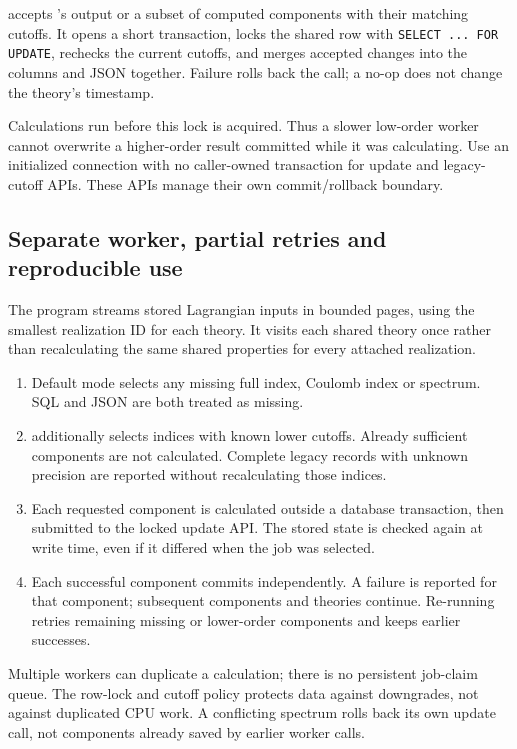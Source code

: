  accepts
's output or a subset of computed components
with their matching cutoffs. It opens a short transaction, locks the shared
row with \texttt{SELECT ... FOR UPDATE}, rechecks the current cutoffs, and merges
accepted changes into the columns and JSON together. Failure rolls back the
call; a no-op does not change the theory's  timestamp.

Calculations run before this lock is acquired. Thus a slower low-order worker
cannot overwrite a higher-order result committed while it was calculating.
Use an initialized connection with no caller-owned transaction for update and
legacy-cutoff APIs. These APIs manage their own commit/rollback boundary.

\clearpage
\subsection{Separate worker, partial retries and reproducible use}
The program  streams stored Lagrangian
inputs in bounded pages, using the smallest realization ID for each theory.
It visits each shared theory once rather than recalculating the same shared
properties for every attached realization.
\begin{enumerate}
\item Default mode selects any missing full index, Coulomb index or spectrum.
SQL  and JSON  are both treated as missing.
\item {} additionally selects indices with known lower cutoffs.
Already sufficient components are not calculated. Complete legacy records with
unknown precision are reported without recalculating those indices.
\item Each requested component is calculated outside a database transaction,
then submitted to the locked update API. The stored state is checked again at
write time, even if it differed when the job was selected.
\item Each successful component commits independently. A failure is reported
for that component; subsequent components and theories continue. Re-running
retries remaining missing or lower-order components and keeps earlier successes.
\end{enumerate}
Multiple workers can duplicate a calculation; there is no persistent job-claim
queue. The row-lock and cutoff policy protects data against downgrades, not
against duplicated CPU work. A conflicting spectrum rolls back its own update
call, not components already saved by earlier worker calls.

